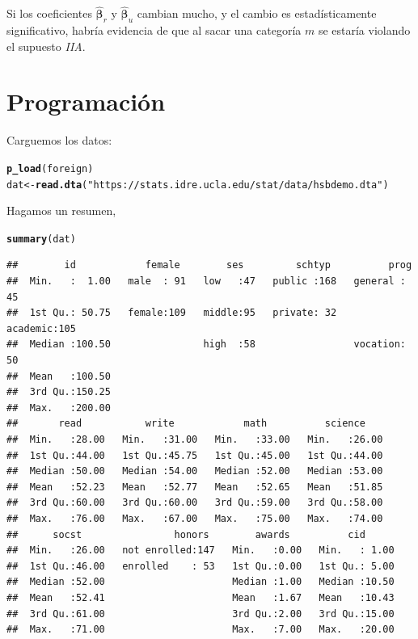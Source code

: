 \documentclass[onesided]{article}\usepackage[]{graphicx}\usepackage[]{color}
\makeatletter
\newcommand{\hlstr}[1]{\textcolor[rgb]{0.192,0.494,0.8}{#1}}%
\newcommand{\hlstd}[1]{\textcolor[rgb]{0.345,0.345,0.345}{#1}}%
\newcommand{\hlkwb}[1]{\textcolor[rgb]{0.69,0.353,0.396}{#1}}%
\newcommand{\hlkwd}[1]{\textcolor[rgb]{0.737,0.353,0.396}{\textbf{#1}}}%
\newenvironment{kframe}{%
 \def\at@end@of@kframe{}%
 \ifinner\ifhmode%
  \def\at@end@of@kframe{\end{minipage}}%
  \begin{minipage}{\columnwidth}%
 \fi\fi%
 \def\FrameCommand##1{\hskip\@totalleftmargin \hskip-\fboxsep
 \colorbox{shadecolor}{##1}\hskip-\fboxsep
     \hskip-\linewidth \hskip-\@totalleftmargin \hskip\columnwidth}%
 \MakeFramed {\advance\hsize-\width
   \@totalleftmargin\z@ \linewidth\hsize
   \@setminipage}}%
 {\par\unskip\endMakeFramed%
 \at@end@of@kframe}
\newenvironment{knitrout}{}{} %
\makeatother
\begin{document}
Si los coeficientes $\boldsymbol{\hat\beta}_{r}$ y $\boldsymbol{\hat\beta}_{u}$ cambian mucho, y el cambio es estad\'isticamente significativo, habr\'ia evidencia de que al sacar una categor\'ia $m$ se estar\'ia violando el supuesto \emph{IIA}.

\section{Programaci\'on}

Carguemos los datos:

\begin{knitrout}
\color{fgcolor}\begin{kframe}
\begin{alltt}
\hlkwd{p_load}\hlstd{(foreign)}
\hlstd{dat} \hlkwb{<-} \hlkwd{read.dta}\hlstd{(}\hlstr{"https://stats.idre.ucla.edu/stat/data/hsbdemo.dta"}\hlstd{)}
\end{alltt}
\end{kframe}
\end{knitrout}

Hagamos un resumen,

\begin{knitrout}
\color{fgcolor}\begin{kframe}
\begin{alltt}
\hlkwd{summary}\hlstd{(dat)}
\end{alltt}
\begin{verbatim}
##        id            female        ses         schtyp          prog    
##  Min.   :  1.00   male  : 91   low   :47   public :168   general : 45  
##  1st Qu.: 50.75   female:109   middle:95   private: 32   academic:105  
##  Median :100.50                high  :58                 vocation: 50  
##  Mean   :100.50                                                        
##  3rd Qu.:150.25                                                        
##  Max.   :200.00                                                        
##       read           write            math          science     
##  Min.   :28.00   Min.   :31.00   Min.   :33.00   Min.   :26.00  
##  1st Qu.:44.00   1st Qu.:45.75   1st Qu.:45.00   1st Qu.:44.00  
##  Median :50.00   Median :54.00   Median :52.00   Median :53.00  
##  Mean   :52.23   Mean   :52.77   Mean   :52.65   Mean   :51.85  
##  3rd Qu.:60.00   3rd Qu.:60.00   3rd Qu.:59.00   3rd Qu.:58.00  
##  Max.   :76.00   Max.   :67.00   Max.   :75.00   Max.   :74.00  
##      socst                honors        awards          cid       
##  Min.   :26.00   not enrolled:147   Min.   :0.00   Min.   : 1.00  
##  1st Qu.:46.00   enrolled    : 53   1st Qu.:0.00   1st Qu.: 5.00  
##  Median :52.00                      Median :1.00   Median :10.50  
##  Mean   :52.41                      Mean   :1.67   Mean   :10.43  
##  3rd Qu.:61.00                      3rd Qu.:2.00   3rd Qu.:15.00  
##  Max.   :71.00                      Max.   :7.00   Max.   :20.00
\end{verbatim}
\end{kframe}
\end{knitrout}
\end{document}
